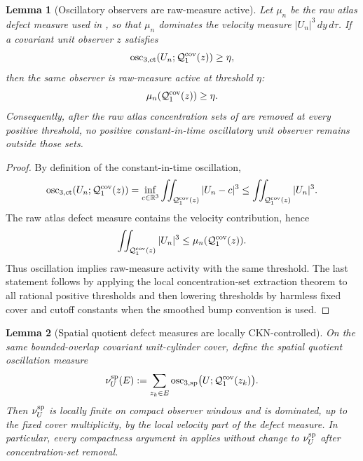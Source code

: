 \documentclass[11pt]{amsart}
\numberwithin{equation}{section}
\theoremstyle{plain}
\newtheorem{lemma}[lemma]{Lemma}
\theoremstyle{definition}
\theoremstyle{remark}
\newcommand{\oscsp}{\operatorname{osc}_{3,\mathrm{sp}}}
\newcommand{\actthree}{\operatorname{osc}_{3,\mathrm{ct}}}
\begin{document}
\begin{lemma}[Oscillatory observers are raw-measure active]
\label{lem:oscillation-active-implies-raw-active}
Let \(\mu_n\) be the raw atlas defect measure used in
, so that \(\mu_n\) dominates the velocity
measure \(|U_n|^3\,dy\,d\tau\).  If a covariant unit observer \(z\) satisfies
\[
   \actthree(U_n;\mathcal Q_1^{\rm cov}(z))\ge\eta ,
\]
then the same observer is raw-measure active at threshold \(\eta\):
\[
   \mu_n(\mathcal Q_1^{\rm cov}(z))\ge\eta .
\]
Consequently, after the raw atlas concentration sets of
 are removed at every positive threshold, no
positive constant-in-time oscillatory unit observer remains outside those sets.
\end{lemma}

\begin{proof}
By definition of the constant-in-time oscillation,
\[
   \actthree(U_n;\mathcal Q_1^{\rm cov}(z))
   =
   \inf_{c\in\mathbb R^3}
      \iint_{\mathcal Q_1^{\rm cov}(z)}|U_n-c|^3
   \le
   \iint_{\mathcal Q_1^{\rm cov}(z)}|U_n|^3 .
\]
The raw atlas defect measure contains the velocity contribution, hence
\[
   \iint_{\mathcal Q_1^{\rm cov}(z)}|U_n|^3
   \le
   \mu_n(\mathcal Q_1^{\rm cov}(z)).
\]
Thus oscillation implies raw-measure activity with the same threshold.  The
last statement follows by applying the local concentration-set extraction theorem to
all rational positive thresholds and then lowering thresholds by harmless fixed
cover and cutoff constants when the smoothed bump convention is used.
\end{proof}

\begin{lemma}[Spatial quotient defect measures are locally CKN-controlled]
\label{lem:spatial-quotient-defect-cKN-control}
On the same bounded-overlap covariant unit-cylinder cover, define the spatial
quotient oscillation measure
\[
   \nu_U^{\rm sp}(E)
   :=
   \sum_{z_k\in E}
      \oscsp\bigl(U;\mathcal Q_1^{\rm cov}(z_k)\bigr).
\]
Then \(\nu_U^{\rm sp}\) is locally finite on compact observer windows and is
dominated, up to the fixed cover multiplicity, by the local velocity part of
the defect measure.  In particular, every compactness argument in
 applies without change to
\(\nu_U^{\rm sp}\) after concentration-set removal.
\end{lemma}
\end{document}
